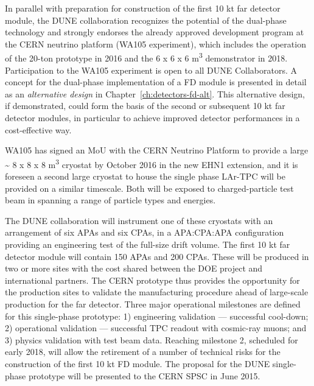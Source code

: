 In parallel with preparation for construction of the first 10 kt far detector module, 
the DUNE collaboration recognizes the potential of the dual-phase technology and 
strongly endorses the already approved development program at the CERN neutrino 
platform (WA105 experiment), which includes the operation of the 20-ton prototype 
in 2016 and the 6 x 6 x 6 m\textsuperscript{3} demonstrator in 2018. Participation 
to the WA105 experiment is open to all DUNE Collaborators. A concept for the dual-phase 
implementation of a FD module is presented in detail as an \textit{alternative 
design} in Chapter~\ref{ch:detectors-fd-alt}. This alternative design, if demonstrated, 
could form the basis of the second or subsequent 10 kt far detector modules, in 
particular to achieve improved detector performances in a cost-effective way. 

WA105 has signed an MoU with the CERN Neutrino Platform to provide a large \textasciitilde{} 
8 x 8 x 8 m\textsuperscript{3} cryostat by October 2016 in the new EHN1 extension, 
and it is foreseen a second large cryostat to house the single phase LAr-TPC will 
be provided on a similar timescale. Both will be exposed to charged-particle test 
beam in spanning a range of particle types and energies.   

The DUNE collaboration will instrument one of these cryostats with an arrangement 
of six APAs and six CPAs, in a APA:CPA:APA configuration providing an engineering 
test of the full-size drift volume. The first 10 kt far detector module will contain 
150 APAs and 200 CPAs. These will be produced in two or more sites with the cost 
shared between the DOE project and international partners. The CERN prototype thus 
provides the opportunity for the production sites to validate the manufacturing 
procedure ahead of large-scale production for the far detector. Three major operational 
milestones are defined for this single-phase prototype: 1) engineering validation 
--- successful cool-down; 2) operational validation --- successful TPC readout with 
cosmic-ray muons; and 3) physics validation with test beam data. Reaching milestone 
2, scheduled for early 2018, will allow the retirement of a number of technical 
risks for the construction of the first 10 kt FD module. The proposal for the DUNE 
single-phase prototype will be presented to the CERN SPSC in June 2015.

